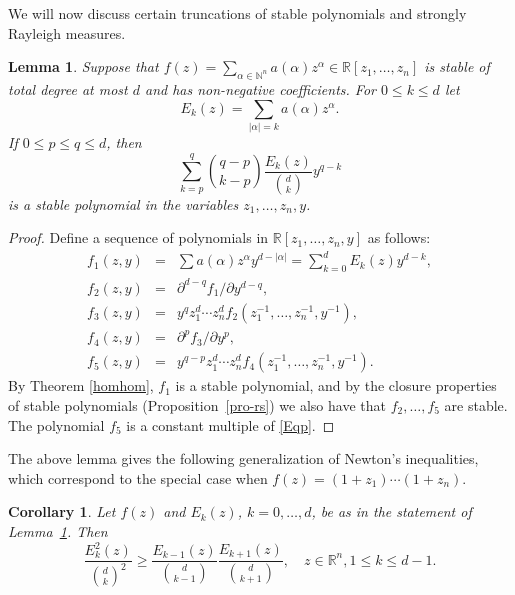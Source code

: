 \documentclass[10pt,reqno]{amsart}
\theoremstyle{plain}
\newtheorem{lemma}[theorem]{Lemma}
\newtheorem{corollary}[theorem]{Corollary}
\theoremstyle{definition}
\theoremstyle{remark}
\newcommand{\NN}{\mathbb{N}}
\newcommand{\RR}{\mathbb{R}}
\begin{document}
We will now discuss certain truncations of stable polynomials and strongly 
Rayleigh measures.

\begin{lemma}\label{lum}
Suppose that  $f(z)= \sum_{\alpha\in\NN^n} a(\alpha) z^\alpha \in 
\RR[z_1,\ldots, z_n]$ is stable of total degree at most $d$ and has 
non-negative 
coefficients. For $0\le k\le d$ let 
$$
E_k(z)= \sum_{\mid \alpha \mid = k}a(\alpha)z^\alpha. 
$$
If $0\leq p \leq q \leq d$, then 
\begin{equation}\label{Eqp}
\sum_{k=p}^q \binom {q-p}{k-p} \frac {E_k(z)}{\binom {d}{k}}y^{q-k}
\end{equation}
 is a stable polynomial in the variables  $z_1, \ldots, z_n,y$.
\end{lemma}

\begin{proof}
Define a sequence of polynomials in $\RR[z_1, \ldots, z_n, y]$ as follows: 
\begin{eqnarray*} 
f_1(z,y) &=&  \sum a(\alpha) z^\alpha y^{d-|\alpha|} 
= \sum_{k=0}^d E_k(z)y^{d-k}, \\ 
f_2(z,y) &=& {\partial^ {d-q}f_1}/{\partial y^{d-q}}, \\
f_3(z,y) &=& y^{q}z_1^d\cdots z_n^d 
f_2(z_1^{-1}, \ldots, z_n^{-1}, y^{-1}), \\
f_4(z,y) &=&   {\partial^ {p}f_3}/{\partial y^{p}}, \\ 
f_5(z,y) &=& y^{q-p}z_1^d\cdots z_n^d 
f_4(z_1^{-1}, \ldots, z_n^{-1}, y^{-1}).
\end{eqnarray*}
By Theorem \ref{homhom},  $f_1$ is a stable polynomial, and by the 
closure properties of stable polynomials (Proposition~\ref{pro-rs}) 
we also have that $f_2, \ldots, f_5$ are stable. The polynomial $f_5$ is a 
constant multiple of \eqref{Eqp}. 
\end{proof}

The above lemma gives the following generalization of Newton's inequalities,
which correspond to the special case when $f(z)=(1+z_1)\cdots (1+z_n)$. 

\begin{corollary}\label{Newton-in}
Let $f(z)$ and $E_k(z)$, $k=0,\ldots,d$, be as in the statement of 
Lemma~\ref{lum}. Then 
\begin{equation}\label{N-IE}
\frac {E_k^2(z)}{{\binom {d}{k}}^2} \geq 
\frac {E_{k-1}(z)}{\binom {d}{k-1}}\frac {E_{k+1}(z)}{\binom {d}{k+1}}, 
\quad z \in \RR^n, 1 \leq k \leq d-1.
\end{equation}
\end{corollary}
\end{document}
